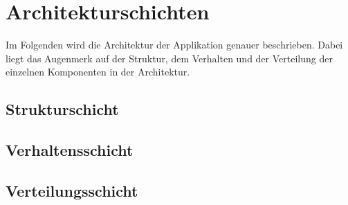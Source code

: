 \chapter{Architekturschichten}\label{ch:arrchitekturschichten}
Im Folgenden wird die Architektur der Applikation genauer beschrieben. Dabei liegt das Augenmerk 
auf der Struktur, dem Verhalten und der Verteilung der einzelnen Komponenten in der Architektur.


\section{Strukturschicht}\label{sec:strukturschicht}

\section{Verhaltensschicht}\label{sec:verhaltensschicht}

\section{Verteilungsschicht}\label{sec:verteilungsschicht}